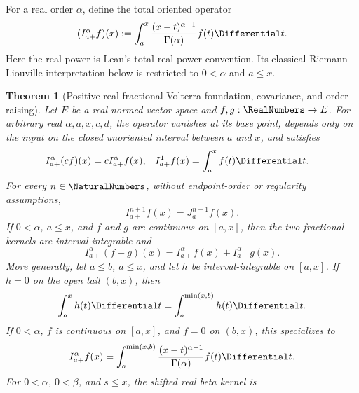 \documentclass[11pt,oneside]{article}
\newtheorem{theorem}{Theorem}[section]
\theoremstyle{definition}
\theoremstyle{remark}
\begin{document}
For a real order \(\alpha\), define the total oriented operator
\begin{equation}
 (I_{a+}^{\alpha}f)(x)
 :=\int_a^x\frac{(x-t)^{\alpha-1}}{\Gamma(\alpha)}f(t)\Differential t.
 \label{eq:fractional-volterra}
\end{equation}
Here the real power is Lean's total real-power convention.  Its classical
Riemann--Liouville interpretation below is restricted to \(0<\alpha\) and \(a\le x\).

\begin{theorem}[Positive-real fractional Volterra foundation, covariance, and order raising]
\label{thm:fractional-volterra-foundation}
Let \(E\) be a real normed vector space and \(f,g:\RealNumbers\to E\).  For arbitrary real
\(\alpha,a,x,c,d\), the operator vanishes at its base point, depends only on the input on
the closed unoriented interval between \(a\) and \(x\), and satisfies
\begin{align}
 I_{a+}^{\alpha}(cf)(x)&=cI_{a+}^{\alpha}f(x),
 & I_{a+}^{1}f(x)&=\int_a^x f(t)\Differential t.                       \label{eq:fractional-volterra-algebra}
\end{align}
For every \(n\in\NaturalNumbers\), without endpoint-order or regularity assumptions,
\begin{equation}
 I_{a+}^{n+1}f(x)=J_a^{n+1}f(x).                             \label{eq:fractional-volterra-natural}
\end{equation}
If \(0<\alpha\), \(a\le x\), and \(f\) and \(g\) are continuous on \([a,x]\), then
the two fractional kernels are interval-integrable and
\begin{equation}
 I_{a+}^{\alpha}(f+g)(x)
 =I_{a+}^{\alpha}f(x)+I_{a+}^{\alpha}g(x).                  \label{eq:fractional-volterra-add-input}
\end{equation}
More generally, let \(a\le b\), \(a\le x\), and let \(h\) be interval-integrable on
\([a,x]\).  If \(h=0\) on the open tail \((b,x)\), then
\begin{equation}
 \int_a^x h(t)\Differential t=\int_a^{\min(x,b)}h(t)\Differential t.
 \label{eq:interval-integral-support-cutoff}
\end{equation}
If \(0<\alpha\), \(f\) is continuous on \([a,x]\), and \(f=0\) on \((b,x)\), this
specializes to
\begin{equation}
 I_{a+}^{\alpha}f(x)
 =\int_a^{\min(x,b)}\frac{(x-t)^{\alpha-1}}{\Gamma(\alpha)}f(t)\Differential t.
 \label{eq:fractional-volterra-support-cutoff}
\end{equation}
For \(0<\alpha\), \(0<\beta\), and \(s\le x\), the shifted real beta kernel is

\end{theorem}
\end{document}
